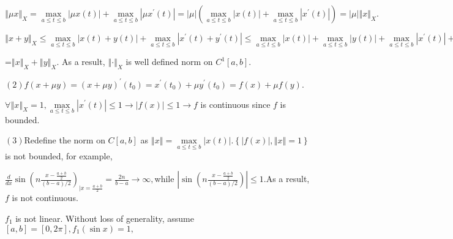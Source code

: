 \documentclass{article}
\begin{document}
$\left\Vert \mu x\right\Vert _{X}=\underset{a\leq t\leq b}{\max }\left\vert
\mu x\left( t\right) \right\vert +\underset{a\leq t\leq b}{\max }\left\vert
\mu x^{\prime }\left( t\right) \right\vert =\left\vert \mu \right\vert
\left( \underset{a\leq t\leq b}{\max }\left\vert x\left( t\right)
\right\vert +\underset{a\leq t\leq b}{\max }\left\vert x^{\prime }\left(
t\right) \right\vert \right) =\left\vert \mu \right\vert \left\Vert
x\right\Vert _{X}.$

$\left\Vert x+y\right\Vert _{X}\leq \underset{a\leq t\leq b}{\max }%
\left\vert x\left( t\right) +y\left( t\right) \right\vert +\underset{a\leq
t\leq b}{\max }\left\vert x^{\prime }\left( t\right) +y^{\prime }\left(
t\right) \right\vert \leq \underset{a\leq t\leq b}{\max }\left\vert x\left(
t\right) \right\vert +\underset{a\leq t\leq b}{\max }\left\vert y\left(
t\right) \right\vert +\underset{a\leq t\leq b}{\max }\left\vert x^{\prime
}\left( t\right) \right\vert +\underset{a\leq t\leq b}{\max }\left\vert
y^{\prime }\left( t\right) \right\vert $

=$\left\Vert x\right\Vert _{X}+\left\Vert y\right\Vert _{X}.$ As a result, $%
\left\Vert \cdot \right\Vert _{X}$ is well defined norm on $C^{1}\left[ a,b%
\right] .$

$\left( 2\right) f\left( x+\mu y\right) =\left( x+\mu y\right) ^{\prime
}\left( t_{0}\right) =x^{\prime }\left( t_{0}\right) +\mu y^{\prime }\left(
t_{0}\right) =f\left( x\right) +\mu f\left( y\right) .$

$\forall \left\Vert x\right\Vert _{X}=1,\underset{a\leq t\leq b}{\max }%
\left\vert x^{\prime }\left( t\right) \right\vert \leq 1\rightarrow
\left\vert f\left( x\right) \right\vert \leq 1\rightarrow f$ is continuous
since $f$ is bounded.

$\left( 3\right) $Redefine the norm on  $C\left[ a,b\right] $ as $\left\Vert
x\right\Vert =\underset{a\leq t\leq b}{\max }\left\vert x\left( t\right)
\right\vert .\left\{ \left\vert f\left( x\right) \right\vert ,\left\Vert
x\right\Vert =1\right\} $ is not bounded, for example,

$\frac{d}{dx}\sin \left( n\frac{x-\frac{a+b}{2}}{\left( b-a\right) /2}%
\right) _{|x=\frac{a+b}{2}}=\frac{2n}{b-a}\rightarrow \infty ,$while $%
\left\vert \sin \left( n\frac{x-\frac{a+b}{2}}{\left( b-a\right) /2}\right)
\right\vert \leq 1.$As a result, $f$ is not continuous.


$f_{1}$ is not linear. Without loss of generality, assume $\left[ a,b\right]
=\left[ 0,2\pi \right] ,f_{1}\left( \sin x\right) =1,$
\end{document}
